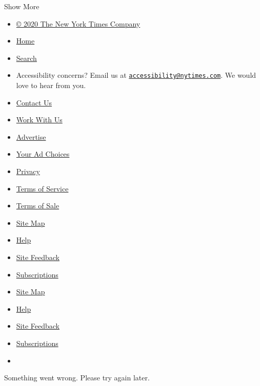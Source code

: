 Show More

\begin{itemize}
\tightlist
\item
  \href{https://help.nytimes.com/hc/en-us/articles/115014792127-Copyright-notice}{©
  2020 The New York Times Company}
\item
  \href{https://www.nytimes.com}{Home}
\item
  \href{http://query.nytimes.com/search/sitesearch/\#/}{Search}
\item
  Accessibility concerns? Email us at
  \href{mailto:accessibility@nytimes.com}{\nolinkurl{accessibility@nytimes.com}}.
  We would love to hear from you.
\item
  \href{https://www.nytimes.com/ref/membercenter/help/infoservdirectory.html}{Contact
  Us}
\item
  \href{http://www.nytco.com/careers}{Work With Us}
\item
  \href{http://nytmediakit.com/}{Advertise}
\item
  \href{https://www.nytimes.com/content/help/rights/privacy/policy/privacy-policy.html\#pp}{Your
  Ad Choices}
\item
  \href{https://www.nytimes.com/privacy}{Privacy}
\item
  \href{https://help.nytimes.com/hc/en-us/articles/115014893428-Terms-of-service}{Terms
  of Service}
\item
  \href{https://help.nytimes.com/hc/en-us/articles/115014893968-Terms-of-sale}{Terms
  of Sale}
\item
  \href{http://spiderbites.nytimes.com}{Site Map}
\item
  \href{https://help.nytimes.com/hc/en-us}{Help}
\item
  \href{https://help.nytimes.com/hc/en-us/articles/115015385887-Contact-us}{Site
  Feedback}
\item
  \href{https://www.nytimes.com/subscriptions/Multiproduct/lp5558.html?campaignId=37WXW}{Subscriptions}
\end{itemize}

\begin{itemize}
\item
  \href{http://spiderbites.nytimes.com}{Site Map}
\item
  \href{https://help.nytimes.com/hc/en-us}{Help}
\item
  \href{https://help.nytimes.com/hc/en-us/articles/115015385887-Contact-us}{Site
  Feedback}
\item
  \href{https://www.nytimes.com/subscriptions/Multiproduct/lp5558.html?campaignId=37WXW}{Subscriptions}
\item
\end{itemize}

Something went wrong. Please try again later.
